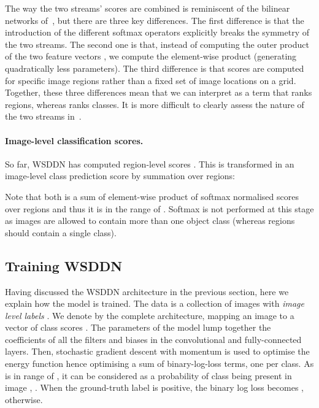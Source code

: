 \documentclass[10pt,twocolumn,letterpaper]{article}
\begin{document}
The way the two streams' scores are combined is reminiscent of the bilinear networks of~\cite{Lin15}, but there are three key differences. The first difference is that the introduction of the different softmax operators explicitly breaks the symmetry of the two streams. The second one is that, instead of computing the outer product of the two feature vectors , we compute the element-wise product  (generating quadratically less parameters). The third difference is that scores  are computed for specific image regions  rather than a fixed set of image locations on a grid. Together, these three differences mean that we can interpret  as a term that ranks regions, whereas  ranks classes. It is more difficult to clearly assess the nature of the two streams in~\cite{Lin15}.

\paragraph{Image-level classification scores.} So far, WSDDN has computed region-level scores . This is transformed in an image-level class prediction score by summation over regions:
 
Note that both  is a sum of element-wise product of softmax normalised scores over  regions and thus it is in the range of . Softmax is not performed at this stage as images are allowed to contain more than one object class (whereas regions should contain a single class).

\subsection{Training WSDDN}\label{s:training}


Having discussed the WSDDN architecture in the previous section, here we explain how the model is trained. The data is a collection of images  with \emph{image level labels} . We denote by  the complete architecture, mapping an image  to a vector of class scores . The parameters  of the model lump together the coefficients of all the filters and biases in the convolutional and fully-connected layers. Then, stochastic gradient descent with momentum is used to optimise the energy function
 hence optimising a sum of  binary-log-loss terms, one per class. As  is in range of , it can be considered as a probability of class  being present in image , \ie . When the ground-truth label is positive, the binary log loss becomes ,  otherwise.
\end{document}
